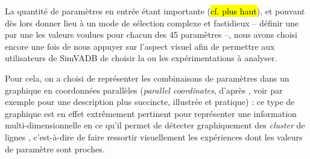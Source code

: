 	La quantité de paramètres en entrée étant importante (\hl{cf. plus haut}), et pouvant dès lors donner lieu à un mode de sélection complexe et fastidieux -- définir une par une les valeurs voulues pour chacun des 45 paramètres --, nous avons choisi encore une fois de nous appuyer sur l'aspect visuel afin de permettre aux utilisateurs de SimVADB de choisir la ou les expérimentations à analyser.

	Pour cela, on a choisi de représenter les combinaisons de paramètres dans un graphique en \og coordonnées parallèles \fg{} (\textit{parallel coordinates}, d'après \cite{inselberg_parallel_1987}, voir \cite{few_multivariate_2006} par exemple pour une description plus succincte, illustrée et pratique) :
	ce type de graphique est en effet extrêmement pertinent pour représenter une information multi-dimensionnelle en ce qu'il permet de détecter graphiquement des \textit{cluster} de lignes \autocite[2]{heinrich_state_2013}, c'est-à-dire de faire ressortir visuellement les expériences dont les valeurs de paramètre sont proches.


